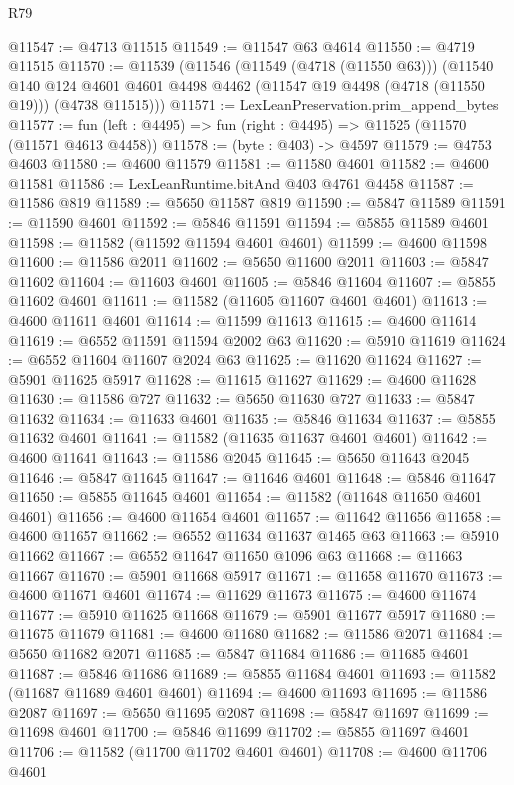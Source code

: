 \begin{lexlean}{R79}
\begin{coremodule}
@11547 := @4713 @11515
@11549 := @11547 @63 @4614
@11550 := @4719 @11515
@11570 := @11539
    (@11546
      (@11549 (@4718 (@11550 @63)))
      (@11540
        @140
        @124
        @4601
        @4601
        @4498
        @4462
        (@11547 @19 @4498 (@4718 (@11550 @19)))
        (@4738 @11515)))
@11571 := LexLeanPreservation.prim_append_bytes
@11577 := fun (left : @4495) => fun (right : @4495) => @11525 (@11570 (@11571 @4613 @4458))
@11578 := (byte : @403) -> @4597
@11579 := @4753 @4603
@11580 := @4600 @11579
@11581 := @11580 @4601
@11582 := @4600 @11581
@11586 := LexLeanRuntime.bitAnd @403 @4761 @4458
@11587 := @11586 @819
@11589 := @5650 @11587 @819
@11590 := @5847 @11589
@11591 := @11590 @4601
@11592 := @5846 @11591
@11594 := @5855 @11589 @4601
@11598 := @11582 (@11592 @11594 @4601 @4601)
@11599 := @4600 @11598
@11600 := @11586 @2011
@11602 := @5650 @11600 @2011
@11603 := @5847 @11602
@11604 := @11603 @4601
@11605 := @5846 @11604
@11607 := @5855 @11602 @4601
@11611 := @11582 (@11605 @11607 @4601 @4601)
@11613 := @4600 @11611 @4601
@11614 := @11599 @11613
@11615 := @4600 @11614
@11619 := @6552 @11591 @11594 @2002 @63
@11620 := @5910 @11619
@11624 := @6552 @11604 @11607 @2024 @63
@11625 := @11620 @11624
@11627 := @5901 @11625 @5917
@11628 := @11615 @11627
@11629 := @4600 @11628
@11630 := @11586 @727
@11632 := @5650 @11630 @727
@11633 := @5847 @11632
@11634 := @11633 @4601
@11635 := @5846 @11634
@11637 := @5855 @11632 @4601
@11641 := @11582 (@11635 @11637 @4601 @4601)
@11642 := @4600 @11641
@11643 := @11586 @2045
@11645 := @5650 @11643 @2045
@11646 := @5847 @11645
@11647 := @11646 @4601
@11648 := @5846 @11647
@11650 := @5855 @11645 @4601
@11654 := @11582 (@11648 @11650 @4601 @4601)
@11656 := @4600 @11654 @4601
@11657 := @11642 @11656
@11658 := @4600 @11657
@11662 := @6552 @11634 @11637 @1465 @63
@11663 := @5910 @11662
@11667 := @6552 @11647 @11650 @1096 @63
@11668 := @11663 @11667
@11670 := @5901 @11668 @5917
@11671 := @11658 @11670
@11673 := @4600 @11671 @4601
@11674 := @11629 @11673
@11675 := @4600 @11674
@11677 := @5910 @11625 @11668
@11679 := @5901 @11677 @5917
@11680 := @11675 @11679
@11681 := @4600 @11680
@11682 := @11586 @2071
@11684 := @5650 @11682 @2071
@11685 := @5847 @11684
@11686 := @11685 @4601
@11687 := @5846 @11686
@11689 := @5855 @11684 @4601
@11693 := @11582 (@11687 @11689 @4601 @4601)
@11694 := @4600 @11693
@11695 := @11586 @2087
@11697 := @5650 @11695 @2087
@11698 := @5847 @11697
@11699 := @11698 @4601
@11700 := @5846 @11699
@11702 := @5855 @11697 @4601
@11706 := @11582 (@11700 @11702 @4601 @4601)
@11708 := @4600 @11706 @4601

\end{coremodule}
\end{lexlean}

